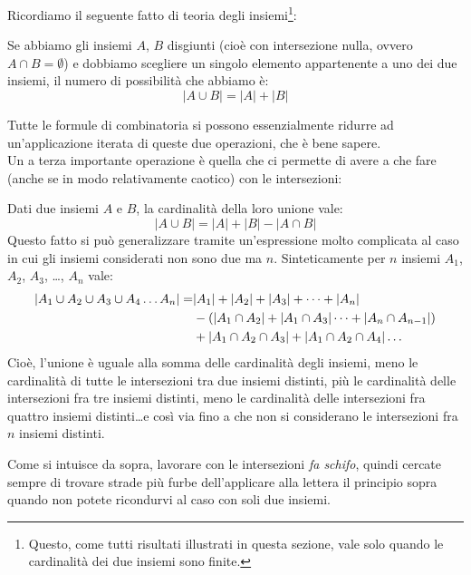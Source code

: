 \documentclass[11pt]{scrartcl}
\begin{document}
	Ricordiamo il seguente fatto di teoria degli insiemi\footnote{Questo, come tutti risultati illustrati in questa sezione, vale solo quando le cardinalità dei due insiemi sono finite.}:
	\begin{theorem}
		Se abbiamo gli insiemi $A$, $B$ disgiunti (cioè con intersezione nulla, ovvero $A\cap B = \emptyset$) e dobbiamo scegliere un singolo elemento appartenente a uno dei due insiemi, il numero di possibilità che abbiamo è:
		$$|A\cup B|=|A|+|B|$$
	\end{theorem}
	Tutte le formule di combinatoria si possono essenzialmente ridurre ad un'applicazione iterata di queste due operazioni, che è bene sapere.\\
	Un a terza importante operazione è quella che ci permette di avere a che fare (anche se in modo relativamente caotico) con le intersezioni:
	\begin{lemma}
		Dati due insiemi $A$ e $B$, la cardinalità della loro unione vale:
		$$|A \cup B| = |A|+|B|-|A \cap B|$$
		Questo fatto si può generalizzare tramite un'espressione molto complicata al caso in cui gli insiemi considerati non sono due ma $n$. Sinteticamente per $n$ insiemi $A_1$, $A_2$, $A_3$, \dots, $A_n$ vale: 
		\begin{equation}\notag
			\begin{split}
				|A_1 \cup A_2 \cup A_3 \cup A_4 \dots A_n| = &  |A_1|+|A_2|+|A_3|+\dots +|A_n|\\
				& -(|A_1 \cap A_2| + |A_1 \cap A_3| \dots +|A_n \cap A_{n-1}|)\\
				& +|A_1 \cap A_2 \cap A_3| + |A_1 \cap A_2 \cap A_4| \dots
			\end{split}
		\end{equation}
		Cioè, l'unione è uguale alla somma delle cardinalità degli insiemi, meno le cardinalità di tutte le intersezioni tra due insiemi distinti, più le cardinalità delle intersezioni fra tre insiemi distinti, meno le cardinalità delle intersezioni fra quattro insiemi distinti\dots e così via fino a che non si considerano le intersezioni fra $n$ insiemi distinti.
	\end{lemma}
	Come si intuisce da sopra, lavorare con le intersezioni \emph{fa schifo}, quindi cercate sempre di trovare strade più furbe dell'applicare alla lettera il principio sopra quando non potete ricondurvi al caso con soli due insiemi.
\end{document}
